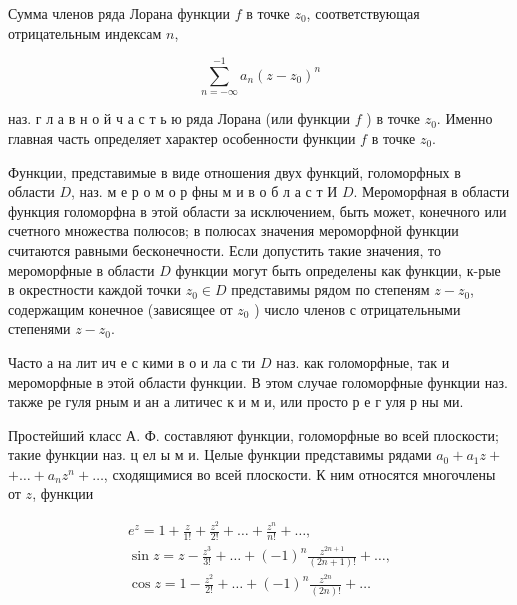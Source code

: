 \documentclass[10pt]{article}
\begin{document}
Сумма членов ряда Лорана функции $f$ в точке $z_{0}$, соответствующая отрицательным индексам $n$,



\[

\sum_{n=-\infty}^{-1} a_{n}\left(z-z_{0}\right)^{n}

\]



наз. г л а в н о й ч а с т ь ю ряда Лорана (или функции $f$ ) в точке $z_{0}$. Именно главная часть определяет характер особенности функции $f$ в точке $z_{0}$.



Функции, представимые в виде отношения двух функций, голоморфных в области $D$, наз. м е р о м о р фны м и в о б л а с т И $D$. Мероморфная в области функция голоморфна в этой области за исключением, быть может, конечного или счетного множества полюсов; в полюсах значения мероморфной функции считаются равными бесконечности. Если допустить такие значения, то мероморфные в области $D$ функции могут быть определены как функции, к-рые в окрестности каждой точки $z_{0} \in D$ представимы рядом по степеням $z-z_{0}$, содержащим конечное (зависящее от $z_{0}$ ) число членов с отрицательными степенями $z-z_{0}$.



Часто а на лит ич е с кими в о и ла с ти $D$ наз. как голоморфные, так и мероморфные в этой области функции. В этом случае голоморфные функции наз. также ре гуля рным и ан а литичес к и м и, или просто р е г уля р ны ми.



Простейший класс А. Ф. составляют функции, голоморфные во всей плоскости; такие функции наз. ц ел ы м и. Целые функции представимы рядами $a_{0}+a_{1} z+$ $+\ldots+a_{n} z^{n}+\ldots$, сходящимися во всей плоскости. К ним относятся многочлены от $z$, функции



\[

\begin{gathered}

e^{z}=1+\frac{z}{1 !}+\frac{z^{2}}{2 !}+\ldots+\frac{z^{n}}{n !}+\ldots, \\

\sin z=z-\frac{z^{3}}{3 !}+\ldots+(-1)^{n} \frac{z^{2 n+1}}{(2 n+1) !}+\ldots, \\

\cos z=1-\frac{z^{2}}{2 !}+\ldots+(-1)^{n} \frac{z^{2 n}}{(2 n) !}+\ldots

\end{gathered}

\]
\end{document}
